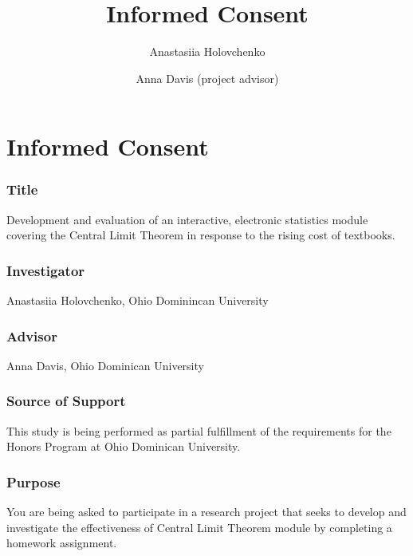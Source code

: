 \documentclass{ximera}
\author{Anastasiia Holovchenko \and Anna Davis (project advisor)} \title{Informed Consent}
\begin{document}
\begin{abstract}
\end{abstract}
\maketitle

\section{Informed Consent}
\subsubsection{Title} Development and evaluation of an interactive, electronic statistics module covering the Central Limit Theorem in response to the rising cost of textbooks.
\subsubsection{Investigator} Anastasiia Holovchenko, Ohio Dominincan University
\subsubsection{Advisor} Anna Davis, Ohio Dominican University
\subsubsection{Source of Support}This study is being performed as partial fulfillment of the requirements for the Honors Program at Ohio Dominican University.
\subsubsection{Purpose} You are being asked to participate in a research project that seeks to develop and investigate the effectiveness of Central Limit Theorem module by completing a homework assignment.
\end{document}

